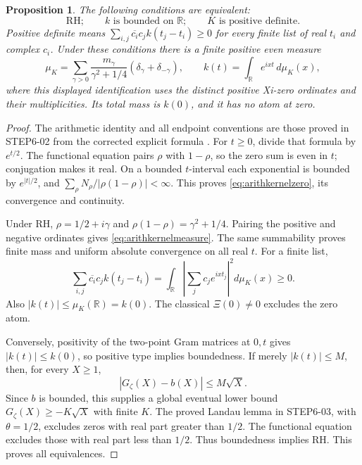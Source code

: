 \documentclass[11pt,a4paper]{article}
\newcommand{\R}{\mathbb R}
\newcommand{\fid}[1]{\textsf{#1}}
\newtheorem*{proposition}{Proposition}
\begin{document}
\begin{proposition}
The following conditions are equivalent:
\[
 \mathrm{RH};\qquad k\text{ is bounded on }\R;\qquad
 K\text{ is positive definite}.
\]
Positive definite means
\(\sum_{i,j}\overline{c_i}c_jk(t_j-t_i)\ge0\)
for every finite list of real \(t_i\) and complex \(c_i\).
Under these conditions there is a finite positive even measure
\begin{equation}\label{eq:arithkernelmeasure}
 \mu_K=\sum_{\gamma>0}
 \frac{m_\gamma}{\gamma^2+1/4}
       (\delta_\gamma+\delta_{-\gamma}),\qquad
 k(t)=\int_\R e^{ixt}\,d\mu_K(x),
\end{equation}
where this displayed identification uses the distinct positive
Xi-zero ordinates and their multiplicities. Its total mass is
\(k(0)\), and it has no atom at zero.
\end{proposition}
\begin{proof}
The arithmetic identity and all endpoint conventions are those proved in
\fid{STEP6-02} from the corrected explicit formula
\cite[corrected Lemma 2.1, pp.~1--2]{ramare}.
For \(t\ge0\), divide that formula by \(e^{t/2}\).
The functional equation pairs \(\rho\) with \(1-\rho\), so the
zero sum is even in \(t\); conjugation makes it real.
On a bounded \(t\)-interval each exponential is bounded by
\(e^{|t|/2}\), and
\(\sum_\rho N_\rho/|\rho(1-\rho)|<\infty\).
This proves \eqref{eq:arithkernelzero}, its convergence and continuity.

Under RH, \(\rho=1/2+i\gamma\) and
\(\rho(1-\rho)=\gamma^2+1/4\).
Pairing the positive and negative ordinates gives
\eqref{eq:arithkernelmeasure}. The same summability proves finite
mass and uniform absolute convergence on all real \(t\).
For a finite list,
\[
 \sum_{i,j}\overline{c_i}c_jk(t_j-t_i)
 =\int_\R\left|\sum_jc_je^{ixt_j}\right|^2d\mu_K(x)\ge0.
\]
Also \(|k(t)|\le\mu_K(\R)=k(0)\).
The classical \(\Xi(0)\ne0\) excludes the zero atom.

Conversely, positivity of the two-point Gram matrices at \(0,t\)
gives \(|k(t)|\le k(0)\), so positive type implies boundedness.
If merely \(|k(t)|\le M\), then, for every \(X\ge1\),
\[
 |G_\zeta(X)-b(X)|\le M\sqrt X.
\]
Since \(b\) is bounded, this supplies a global eventual lower bound
\(G_\zeta(X)\ge-K\sqrt X\) with finite \(K\).
The proved Landau lemma in \fid{STEP6-03}, with \(\theta=1/2\),
excludes zeros with real part greater than \(1/2\).
The functional equation excludes those with real part less than \(1/2\).
Thus boundedness implies RH. This proves all equivalences.
\end{proof}
\end{document}
